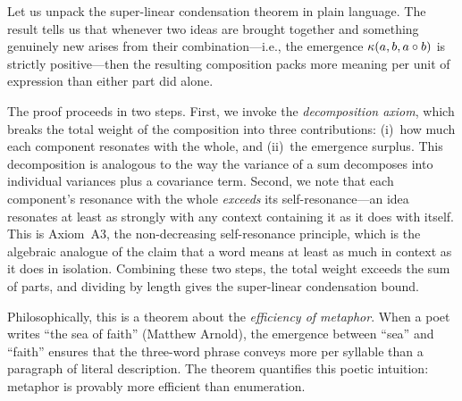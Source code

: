 \begin{remark}
Let us unpack the super-linear condensation theorem in plain language.
The result tells us that whenever two ideas are brought together and
something genuinely new arises from their combination---i.e., the
emergence $\kappa(a,b,a \circ b)$ is strictly positive---then the
resulting composition packs more meaning per unit of expression than
either part did alone.

The proof proceeds in two steps.  First, we invoke the \emph{decomposition
axiom}, which breaks the total weight of the composition into three
contributions: (i)~how much each component resonates with the whole,
and (ii)~the emergence surplus.  This decomposition is analogous to
the way the variance of a sum decomposes into individual variances plus
a covariance term.  Second, we note that each component's resonance
with the whole \emph{exceeds} its self-resonance---an idea resonates
at least as strongly with any context containing it as it does with itself.
This is Axiom~A3, the non-decreasing self-resonance principle, which
is the algebraic analogue of the claim that a word means at least as
much in context as it does in isolation.  Combining these two steps,
the total weight exceeds the sum of parts, and dividing by length gives
the super-linear condensation bound.

Philosophically, this is a theorem about the \emph{efficiency of metaphor}.
When a poet writes ``the sea of faith'' (Matthew Arnold), the emergence
between ``sea'' and ``faith'' ensures that the three-word phrase conveys
more per syllable than a paragraph of literal description.  The theorem
quantifies this poetic intuition: metaphor is provably more efficient
than enumeration.
\end{remark}

